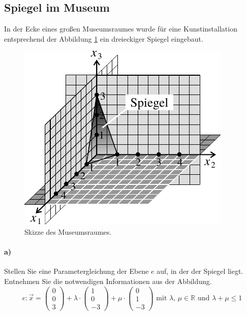 \documentclass{ajc}
\numberwithin{equation}{subsection}
\begin{document}
	\subsection{Spiegel im Museum}
	In der Ecke eines großen Museumsraumes wurde für eine Kunstinstallation entsprechend der Abbildung \ref{fig:007_spiegel} ein dreieckiger Spiegel eingebaut. 
	\begin{figure}[ht]
		\centering
		\includegraphics[width=.5\textwidth]{ma_007_spiegelmuseum.pdf}
		\caption{Skizze des Museumsraumes.}
		\label{fig:007_spiegel}
	\end{figure}
	
	\paragraph{a)} Stellen Sie eine Parametergleichung der Ebene $e$ auf, in der der Spiegel liegt. Entnehmen Sie die notwendigen Informationen aus der Abbildung.
	\begin{equation}
		e: \overrightarrow{x}=\left(\begin{array}{r} 0 \\ 0 \\ 3\end{array}\right) + \lambda \cdot \left(\begin{array}{r} 1 \\ 0 \\ -3\end{array}\right) + \mu \cdot \left(\begin{array}{r} 0 \\ 1 \\ -3\end{array}\right) \text{ mit } \lambda,\,\mu \in \mathbb{R} \text{ und } \lambda + \mu \leq 1
	\end{equation}
	
\end{document}
